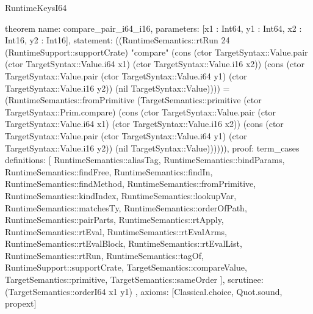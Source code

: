 \begin{lexlean}{RuntimeKeysI64}
\begin{semanticmodule}
theorem{
  name: compare_pair_i64_i16,
  parameters: [x1 : Int64, y1 : Int64, x2 : Int16, y2 : Int16],
  statement: ((RuntimeSemantics::rtRun 24 (RuntimeSupport::supportCrate) "compare" (cons (ctor TargetSyntax::Value.pair (ctor TargetSyntax::Value.i64 x1) (ctor TargetSyntax::Value.i16 x2)) (cons (ctor TargetSyntax::Value.pair (ctor TargetSyntax::Value.i64 y1) (ctor TargetSyntax::Value.i16 y2)) (nil TargetSyntax::Value)))) = (RuntimeSemantics::fromPrimitive (TargetSemantics::primitive (ctor TargetSyntax::Prim.compare) (cons (ctor TargetSyntax::Value.pair (ctor TargetSyntax::Value.i64 x1) (ctor TargetSyntax::Value.i16 x2)) (cons (ctor TargetSyntax::Value.pair (ctor TargetSyntax::Value.i64 y1) (ctor TargetSyntax::Value.i16 y2)) (nil TargetSyntax::Value)))))),
  proof: term_cases{
    definitions: [
      RuntimeSemantics::aliasTag,
      RuntimeSemantics::bindParams,
      RuntimeSemantics::findFree,
      RuntimeSemantics::findIn,
      RuntimeSemantics::findMethod,
      RuntimeSemantics::fromPrimitive,
      RuntimeSemantics::kindIndex,
      RuntimeSemantics::lookupVar,
      RuntimeSemantics::matchesTy,
      RuntimeSemantics::orderOfPath,
      RuntimeSemantics::pairParts,
      RuntimeSemantics::rtApply,
      RuntimeSemantics::rtEval,
      RuntimeSemantics::rtEvalArms,
      RuntimeSemantics::rtEvalBlock,
      RuntimeSemantics::rtEvalList,
      RuntimeSemantics::rtRun,
      RuntimeSemantics::tagOf,
      RuntimeSupport::supportCrate,
      TargetSemantics::compareValue,
      TargetSemantics::primitive,
      TargetSemantics::sameOrder
    ],
    scrutinee: (TargetSemantics::orderI64 x1 y1)
  },
  axioms: [Classical.choice, Quot.sound, propext]
}


\end{semanticmodule}
\end{lexlean}
